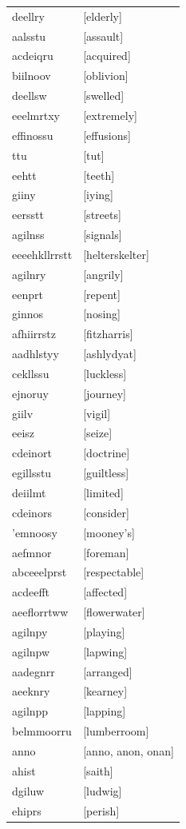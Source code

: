 \documentclass{article}
\begin{document}
\begin{tabular}{ll}
deellry & [elderly] \\
aalsstu & [assault] \\
acdeiqru & [acquired] \\
biilnoov & [oblivion] \\
deellsw & [swelled] \\
eeelmrtxy & [extremely] \\
effinossu & [effusions] \\
ttu & [tut] \\
eehtt & [teeth] \\
giiny & [iying] \\
eersstt & [streets] \\
agilnss & [signals] \\
eeeehkllrrstt & [helterskelter] \\
agilnry & [angrily] \\
eenprt & [repent] \\
ginnos & [nosing] \\
afhiirrstz & [fitzharris] \\
aadhlstyy & [ashlydyat] \\
cekllssu & [luckless] \\
ejnoruy & [journey] \\
giilv & [vigil] \\
eeisz & [seize] \\
cdeinort & [doctrine] \\
egillsstu & [guiltless] \\
deiilmt & [limited] \\
cdeinors & [consider] \\
'emnoosy & [mooney's] \\
aefmnor & [foreman] \\
abceeelprst & [respectable] \\
acdeefft & [affected] \\
aeeflorrtww & [flowerwater] \\
agilnpy & [playing] \\
agilnpw & [lapwing] \\
aadegnrr & [arranged] \\
aeeknry & [kearney] \\
agilnpp & [lapping] \\
belmmoorru & [lumberroom] \\
anno & [anno, anon, onan] \\
ahist & [saith] \\
dgiluw & [ludwig] \\
ehiprs & [perish] \\

\end{tabular}
\end{document}
